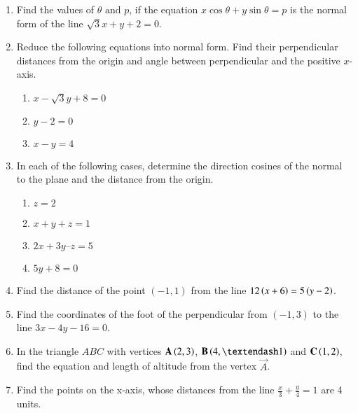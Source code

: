 \begin{enumerate}[label=\thesubsection.\arabic*,ref=\thesubsection.\theenumi]
	\item Find the values of $\theta \text{ and } p$, if the equation $x\cos\theta+y\sin\theta=p$ is the normal form
of the line $\sqrt{3}x+y+2=0$.
\\
\solution
		
\item  Reduce the following equations into normal form. Find their perpendicular distances from the origin and angle between perpendicular and the positive $x$-axis.
\label{chapters/11/10/3/3}
\begin{enumerate}
	\item $x-\sqrt{3}y+8=0$ 
	\item $y-2=0$
	\item $x-y=4$
\end{enumerate}
\solution

 \item  In each of the following cases, determine the direction cosines of the normal to
the plane and the distance from the origin.
\begin{enumerate}
	\item $z=2$ 
	\item $x + y + z = 1$
	\item $2x + 3y – z = 5$
	\item $5y + 8 = 0$
\end{enumerate}
    \solution
		
\item Find the distance of the point $(-1,1)$ from the line $12\left(x+6\right) = 5\left(y-2\right)$. 
\label{chapters/11/10/3/4}
	\\
\solution 

\item Find the coordinates of the foot of the perpendicular from $(-1, 3)$ to the line $3x-4y-16=0$.  
\label{chapters/11/10/3/14}
\\
\solution

\item In the triangle $ABC$ with vertices $\mathbf{A} \left(2, 3\right)$, $\vec{B} \brak{4, –1}$ and $\mathbf{C} \left(1, 2\right)$, find the equation and length of altitude from the vertex $\vec{A}$.
\label{chapters/11/10/3/17}
\\
\solution

\item Find the points on the x-axis, whose distances from the line $\frac{x}{3}+\frac{y}{4}=1$ are 4 units.
\label{chapters/11/10/3/5}
	\\

\end{enumerate}
